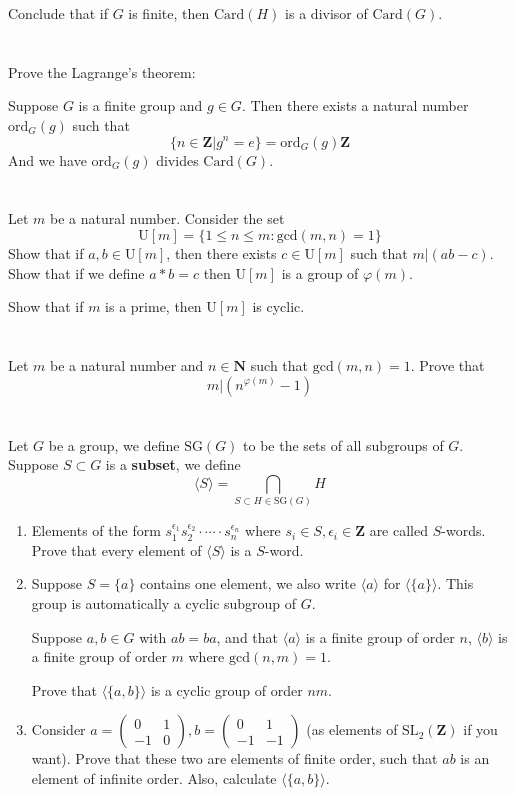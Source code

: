 \documentclass{report}
\newcommand{\Mat}[4]{\begin{pmatrix}{#1}&{#2}\\{#3}&{#4}\end{pmatrix}}
\begin{document}
Conclude that if $G$ is finite, then $\text{Card}(H)$ is a divisor of $\text{Card}(G)$.
\section{}
Prove the Lagrange's theorem:

Suppose $G$ is a finite group and $g \in G$. Then there exists a natural number $\text{ord}_G(g)$ such that
\[\{n \in \mathbf{Z}| g^n = e\} = \text{ord}_G(g)\mathbf{Z}\]
And we have $\text{ord}_G(g)$ divides $\text{Card}(G)$.
\section{}
Let $m$ be a natural number. Consider the set
\[\text{U}[m] = \{1\le n \le m: \text{gcd}(m,n) = 1\}\]
Show that if $a,b \in \text{U}[m]$, then there exists $c \in \text{U}[m]$ such that $m|(ab-c)$. Show that if we define $a*b = c$ then $\text{U}[m]$ is a group of $\varphi(m)$.

Show that if $m$ is a prime, then $\text{U}[m]$ is cyclic.
\section{}
Let $m$ be a natural number and $n\in \mathbf{N}$ such that $\text{gcd}(m,n) = 1$. Prove that
\[m|(n^{\varphi(m)} - 1)\]
\section{}
Let $G$ be a group, we define $\text{SG}(G)$ to be the sets of all subgroups of $G$. Suppose $S\subset G$ is a \textbf{subset}, we define
\[\langle S\rangle = \bigcap_{S \subset H \in \text{SG}(G)} H\]
\begin{enumerate}
\item Elements of the form $s_1^{\epsilon_1}s_2^{\epsilon_2}\cdot\cdots\cdot s_n^{\epsilon_n}$ where $s_i \in S, \epsilon_i \in \mathbf{Z}$ are called $S$-words. Prove that every element of $\langle S\rangle$ is a $S$-word.
\item Suppose $S = \{a\}$ contains one element, we also write $\langle a \rangle$ for $\langle \{a\} \rangle$. This group is automatically a cyclic subgroup of $G$.

Suppose $a,b \in G$ with $ab = ba$, and that $\langle a \rangle$ is a finite group of order $n$, $\langle b \rangle$ is a finite group of order $m$ where $\text{gcd}(n,m) = 1$.

Prove that $\langle \{a,b\} \rangle$ is a cyclic group of order $nm$.
\item Consider $a = \Mat{0}{1}{-1}{0}, b = \Mat{0}{1}{-1}{-1}$ (as elements of $\text{SL}_2(\mathbf{Z})$ if you want). Prove that these two are elements of finite order, such that $ab$ is an element of infinite order. Also, calculate $\langle \{a,b\} \rangle$.
\end{enumerate}
\end{document}
